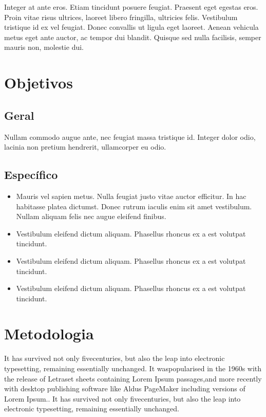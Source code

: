 \documentclass[
	12pt,				%
	openright,			%
	oneside,			%
	a4paper,			%
	chapter=TITLE,		%
	english,			%
	brazil,				%
	]{abntex2}
\begin{document}
Integer at ante eros. Etiam tincidunt posuere feugiat. Praesent eget egestas eros. Proin vitae risus ultrices, laoreet libero fringilla, ultricies felis. Vestibulum tristique id ex vel feugiat. Donec convallis ut ligula eget laoreet. Aenean vehicula metus eget ante auctor, ac tempor dui blandit. Quisque sed nulla facilisis, semper mauris non, molestie dui.


\chapter{Objetivos}
\section{Geral}
Nullam commodo augue ante, nec feugiat massa tristique id. Integer dolor odio, lacinia non pretium hendrerit, ullamcorper eu odio.


\section{Específico}
\begin{itemize}
\item Mauris vel sapien metus. Nulla feugiat justo vitae auctor efficitur. In hac habitasse platea dictumst. Donec rutrum iaculis enim sit amet vestibulum. Nullam aliquam felis nec augue eleifend finibus.
\item Vestibulum eleifend dictum aliquam. Phasellus rhoncus ex a est volutpat tincidunt.
\item Vestibulum eleifend dictum aliquam. Phasellus rhoncus ex a est volutpat tincidunt.
\item Vestibulum eleifend dictum aliquam. Phasellus rhoncus ex a est volutpat tincidunt.
\end{itemize} 

\chapter{Metodologia}
It has survived not only fivecenturies, but also the leap into electronic typesetting, remaining essentially unchanged. It waspopularised in the 1960s with the release of Letraset sheets containing Lorem Ipsum passages,and more recently with desktop publishing software like Aldus PageMaker including versions of Lorem Ipsum.\cite{ahsan2016multipath}. It has survived not only fivecenturies, but also the leap into electronic typesetting, remaining essentially unchanged.
\end{document}
